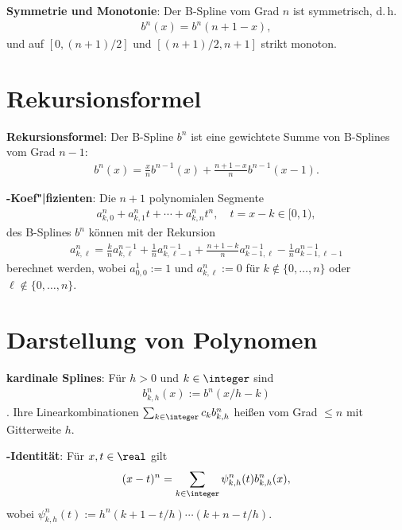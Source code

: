 \textbf{Symmetrie und Monotonie}:
Der B-Spline vom Grad $n$ ist symmetrisch, d.\,h.
\begin{align*}
    b^n(x) = b^n(n + 1 - x),
\end{align*}
und auf $[0, (n + 1)/2]$ und $[(n + 1)/2, n + 1]$ strikt monoton.

\pagebreak

\section{%
    Rekursionsformel%
}

\textbf{Rekursionsformel}:
Der B-Spline $b^n$ ist eine gewichtete Summe von B-Splines vom Grad $n - 1$:
\begin{align*}
    b^n(x) = \frac{x}{n} b^{n-1}(x) + \frac{n + 1 - x}{n} b^{n-1}(x - 1).
\end{align*}

\textbf{-Koef"|fizienten}:
Die $n + 1$ polynomialen Segmente
\begin{align*}
    a_{k,0}^n + a_{k,1}^n t + \dotsb + a_{k,n}^n t^n,\quad
    t = x - k \in [0, 1),
\end{align*}
des B-Splines $b^n$ können mit der Rekursion
\begin{align*}
    a_{k,\ell}^n = \frac{k}{n} a_{k,\ell}^{n-1} + \frac{1}{n} a_{k,\ell-1}^{n-1} +
    \frac{n + 1 - k}{n} a_{k-1,\ell}^{n-1} - \frac{1}{n} a_{k-1,\ell-1}^{n-1}
\end{align*}
berechnet werden, wobei $a_{0,0}^1 := 1$ und $a_{k,\ell}^n := 0$ für $k \notin \{0, \dotsc, n\}$
oder $\ell \notin \{0, \dotsc, n\}$.

\section{%
    Darstellung von Polynomen%
}

\textbf{kardinale Splines}:
Für $h > 0$ und $k \in \integer$ sind
\begin{align*}
    b_{k,h}^n(x) := b^n(x/h - k)
\end{align*}
.
Ihre Linearkombinationen $\sum_{k \in \integer} c_k b_{k,h}^n$ heißen
 vom Grad $\le n$ mit Gitterweite $h$.

\textbf{-Identität}:
Für $x, t \in \real$ gilt
\begin{align*}
    (x - t)^n = \sum_{k \in \integer} \psi_{k,h}^n(t) b_{k,h}^n(x),
\end{align*}
wobei $\psi_{k,h}^n(t) := h^n (k + 1 - t/h) \dotsm (k + n - t/h)$.

